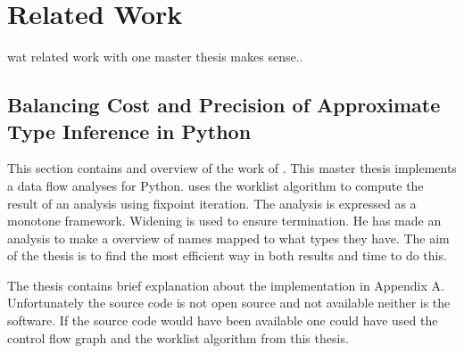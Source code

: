 \section{Related Work}
wat related work with one master thesis makes sense..

\subsection{Balancing Cost and Precision of Approximate Type Inference in Python}
This section contains and overview of the work of \citet{fritz}.
This master thesis implements a data flow analyses for Python.
\citet{fritz} uses the worklist algorithm to compute the result of an analysis using fixpoint iteration.
The analysis is expressed as a monotone framework.
Widening is used to ensure termination.
He has made an analysis to make a overview of names mapped to what types they have.
The aim of the thesis is to find the most efficient way in both results and time to do this.

The thesis contains brief explanation about the implementation in Appendix A.
Unfortunately the source code is not open source and not available neither is the software.
If the source code would have been available one could have used the control flow graph and the worklist algorithm from this thesis.
